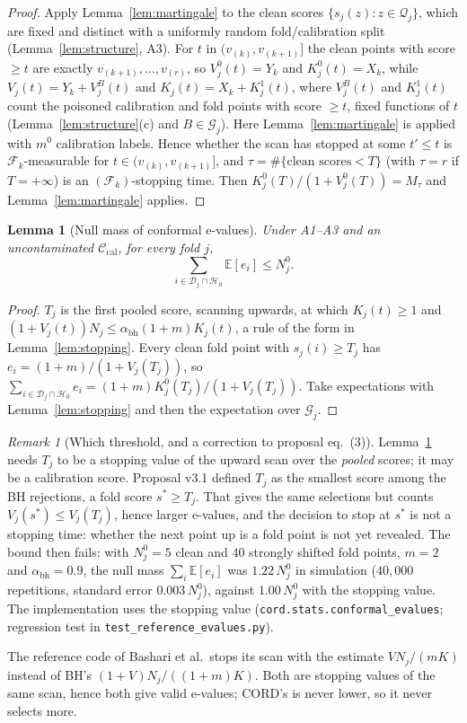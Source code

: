 \documentclass[11pt]{article}
\newtheorem{lemma}{Lemma}
\theoremstyle{definition}
\theoremstyle{remark}
\newtheorem{remark}{Remark}
\newcommand{\Cal}{\mathcal{C}_{\mathrm{cal}}}
\newcommand{\D}{\mathcal{D}}
\newcommand{\G}{\mathcal{G}}
\newcommand{\F}{\mathcal{F}}
\newcommand{\Q}{\mathcal{Q}}
\newcommand{\Hnull}{\mathcal{H}_0}
\newcommand{\E}{\mathbb{E}}
\newcommand{\1}{\mathbf{1}}
\begin{document}
\begin{proof}
Apply Lemma~\ref{lem:martingale} to the clean scores $\{s_j(z):z\in\Q_j\}$, which are fixed and
distinct with a uniformly random fold/calibration split (Lemma~\ref{lem:structure}, A3). For $t$
in $(v_{(k)},v_{(k+1)}]$ the clean points with score $\ge t$ are exactly
$v_{(k+1)},\dots,v_{(r)}$, so $V^0_j(t)=Y_k$ and $K^0_j(t)=X_k$, while
$V_j(t)=Y_k+V^B_j(t)$ and $K_j(t)=X_k+K^1_j(t)$, where $V^B_j(t)$ and $K^1_j(t)$ count the poisoned
calibration and fold points with score $\ge t$, fixed functions of $t$ (Lemma~\ref{lem:structure}(c)
and $B\in\G_j$). Here Lemma~\ref{lem:martingale} is applied with $m^0$ calibration labels. Hence whether the scan has stopped at some
$t'\le t$ is $\F_k$-measurable for $t\in(v_{(k)},v_{(k+1)}]$, and $\tau=\#\{\text{clean scores}<T\}$
(with $\tau=r$ if $T=+\infty$) is an $(\F_k)$-stopping time. Then
$K^0_j(T)/(1+V^0_j(T))=M_\tau$ and Lemma~\ref{lem:martingale} applies.
\end{proof}

\begin{lemma}[Null mass of conformal e-values]\label{lem:evalues}
Under A1--A3 and an uncontaminated $\Cal$, for every fold $j$,
\[
\textstyle\sum_{i\in\D_j\cap\Hnull}\E[e_i]\le N_j^0 .
\]
\end{lemma}

\begin{proof}
$T_j$ is the first pooled score, scanning upwards, at which $K_j(t)\ge1$ and
$(1+V_j(t))N_j\le\alpha_{\mathrm{bh}}(1+m)K_j(t)$, a rule of the form in Lemma~\ref{lem:stopping}. Every clean fold point with $s_j(i)\ge T_j$ has
$e_i=(1+m)/(1+V_j(T_j))$, so $\sum_{i\in\D_j\cap\Hnull}e_i=(1+m)K^0_j(T_j)/(1+V_j(T_j))$. Take
expectations with Lemma~\ref{lem:stopping} and then the expectation over $\G_j$.
\end{proof}

\begin{remark}[Which threshold, and a correction to proposal eq.~(3)]\label{rem:threshold}
Lemma~\ref{lem:evalues} needs $T_j$ to be a stopping value of the upward scan over the
\emph{pooled} scores; it may be a calibration score. Proposal v3.1 defined $T_j$ as the smallest
score among the BH rejections, a fold score $s^\ast\ge T_j$. That gives the same selections but
counts $V_j(s^\ast)\le V_j(T_j)$, hence larger e-values, and the decision to stop at $s^\ast$ is not a
stopping time: whether the next point up is a fold point is not yet revealed. The bound then
fails: with $N_j^0=5$ clean and $40$ strongly shifted fold points, $m=2$ and
$\alpha_{\mathrm{bh}}=0.9$, the null mass $\sum_{i}\E[e_i]$ was $1.22\,N_j^0$ in simulation
($40{,}000$ repetitions, standard error $0.003\,N_j^0$), against $1.00\,N_j^0$ with the stopping
value. The implementation uses the stopping value (\texttt{cord.stats.conformal\_evalues};
regression test in \texttt{test\_reference\_evalues.py}).

The reference code of Bashari et al.\ stops its scan with the estimate $V N_j/(mK)$ instead of
BH's $(1+V)N_j/((1+m)K)$. Both are stopping values of the same scan, hence both give valid
e-values; CORD's is never lower, so it never selects more.
\end{remark}
\end{document}
